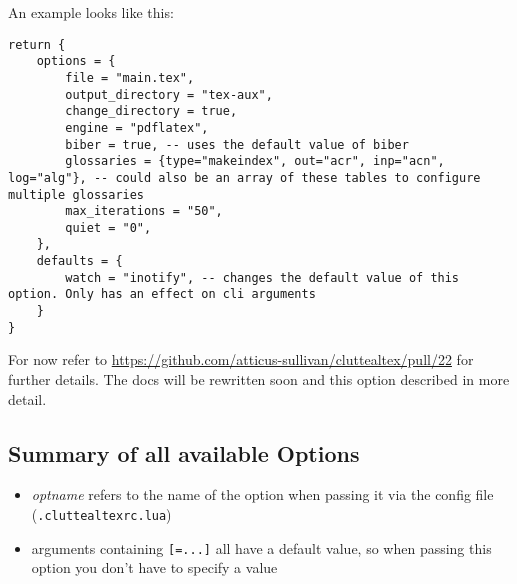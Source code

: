 \documentclass[a4paper, 11pt]{scrartcl}
\begin{document}
An example looks like this:
\begin{verbatim}
return {
	options = {
		file = "main.tex",
		output_directory = "tex-aux",
		change_directory = true,
		engine = "pdflatex",
		biber = true, -- uses the default value of biber
		glossaries = {type="makeindex", out="acr", inp="acn", log="alg"}, -- could also be an array of these tables to configure multiple glossaries
		max_iterations = "50",
		quiet = "0",
	},
	defaults = {
		watch = "inotify", -- changes the default value of this option. Only has an effect on cli arguments 
	}
}
\end{verbatim}

For now refer to \url{https://github.com/atticus-sullivan/cluttealtex/pull/22} for further details.
The docs will be rewritten soon and this option described in more detail.

\begin{landscape}
\section{Summary of all available Options} \label{sec:listOpt}
\begin{itemize}
	\item \emph{optname} refers to the name of the option when passing it via the config file (\texttt{.cluttealtexrc.lua})
	\item arguments containing \texttt{[=...]} all have a default value, so when passing this option you don't have to specify a value
\end{itemize}

\end{landscape}
\end{document}
